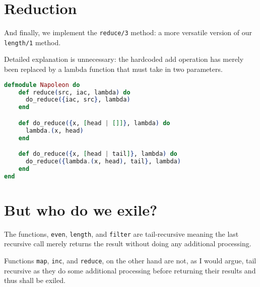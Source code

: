 \section{Reduction}
And finally, we implement the \texttt{reduce/3} method: a more versatile version of our \texttt{length/1} method.

Detailed explanation is unnecessary: the hardcoded add operation has merely been replaced by a lambda function that must take in two parameters.


\begin{lstlisting}[language=Elixir, caption=Mapping\, recursively]
defmodule Napoleon do
    def reduce(src, iac, lambda) do
      do_reduce({iac, src}, lambda)
    end

    def do_reduce({x, [head | []]}, lambda) do
      lambda.(x, head)
    end

    def do_reduce({x, [head | tail]}, lambda) do
      do_reduce({lambda.(x, head), tail}, lambda)
    end
end
\end{lstlisting}

\section{But who do we exile?}
The functions, \texttt{even}, \texttt{length}, and \texttt{filter} are tail-recursive meaning the last recursive call merely returns the result without doing any additional processing.

Functions \texttt{map}, \texttt{inc}, and \texttt{reduce}, on the other hand are not, as I would argue, tail recursive as they do some additional processing before returning their results and thus shall be exiled.